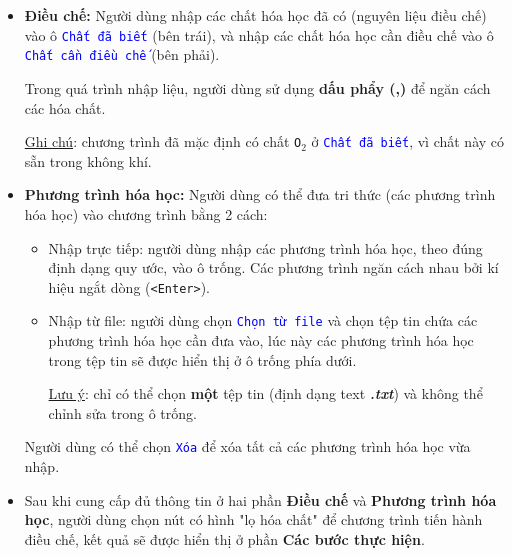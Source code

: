 \documentclass[a4paper]{article}
\begin{document}
\begin{enumerate}
\begin{itemize}
			\item \textbf{Điều chế:} Người dùng nhập các chất hóa học đã có (nguyên liệu điều chế) vào ô \textcolor{blue}{\texttt{Chất đã biết}} (bên trái), và nhập các chất hóa học cần điều chế vào ô \textcolor{blue}{\texttt{Chất cần điều chế}} (bên phải). 
			
			Trong quá trình nhập liệu, người dùng sử dụng \textbf{dấu phẩy (,)} để ngăn cách các hóa chất.
			
			\underline{Ghi chú}: chương trình đã mặc định có chất \texttt{O$_2$} ở \textcolor{blue}{\texttt{Chất đã biết}}, vì chất này có sẵn trong không khí.
			
			\item \textbf{Phương trình hóa học:} Người dùng có thể đưa tri thức (các phương trình hóa học) vào chương trình bằng 2 cách:
			\begin{itemize}
				\item Nhập trực tiếp: người dùng nhập các phương trình hóa học, theo đúng định dạng quy ước, vào ô trống. Các phương trình ngăn cách nhau bởi kí hiệu ngắt dòng (\texttt{<Enter>}).
				
				\item Nhập từ file: người dùng chọn \textcolor{blue}{\texttt{Chọn từ file}} và chọn tệp tin chứa các phương trình hóa học cần đưa vào, lúc này các phương trình hóa học trong tệp tin sẽ được hiển thị ở ô trống phía dưới.
				
				\underline{Lưu ý}: chỉ có thể chọn \textbf{một} tệp tin (định dạng text \textbf{\textit{.txt}}) và không thể chỉnh sửa trong ô trống.
			\end{itemize}
		
			Người dùng có thể chọn \textcolor{blue}{\texttt{Xóa}} để xóa tất cả các phương trình hóa học vừa nhập.
			
			\item Sau khi cung cấp đủ thông tin ở hai phần \textbf{Điều chế} và \textbf{Phương trình hóa học}, người dùng chọn nút có hình "lọ hóa chất" để chương trình tiến hành điều chế, kết quả sẽ được hiển thị ở phần \textbf{Các bước thực hiện}.
		\end{itemize}
	

\end{enumerate}
\end{document}
